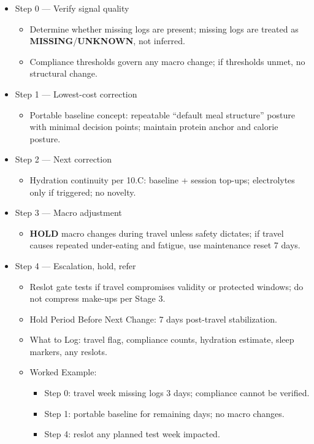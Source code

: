 \documentclass[10pt]{article}
\begin{document}
\begin{itemize}
\item Step 0 — Verify signal quality
  \begin{itemize}
  \item Determine whether missing logs are present; missing logs are treated as \textbf{MISSING}/\textbf{UNKNOWN}, not inferred.
  \item Compliance thresholds govern any macro change; if thresholds unmet, no structural change.
  \end{itemize}
\item Step 1 — Lowest-cost correction
  \begin{itemize}
  \item Portable baseline concept: repeatable “default meal structure” posture with minimal decision points; maintain protein anchor and calorie posture.
  \end{itemize}
\item Step 2 — Next correction
  \begin{itemize}
  \item Hydration continuity per 10.C: baseline + session top-ups; electrolytes only if triggered; no novelty.
  \end{itemize}
\item Step 3 — Macro adjustment
  \begin{itemize}
  \item \textbf{HOLD} macro changes during travel unless safety dictates; if travel causes repeated under-eating and fatigue, use maintenance reset 7 days.
  \end{itemize}
\item Step 4 — Escalation, hold, refer
  \begin{itemize}
  \item Reslot gate tests if travel compromises validity or protected windows; do not compress make-ups per Stage 3.
  \item Hold Period Before Next Change: 7 days post-travel stabilization.
  \item What to Log: travel flag, compliance counts, hydration estimate, sleep markers, any reslots.
  \item Worked Example:
    \begin{itemize}
    \item Step 0: travel week missing logs 3 days; compliance cannot be verified.
    \item Step 1: portable baseline for remaining days; no macro changes.
    \item Step 4: reslot any planned test week impacted.
    \end{itemize}
  \end{itemize}
\end{itemize}
\end{document}
